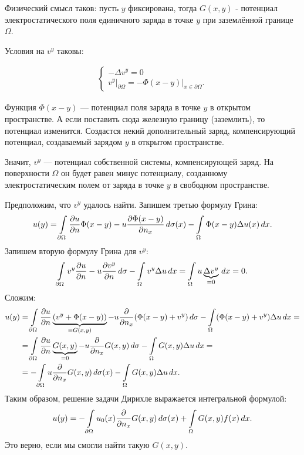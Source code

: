 Физический смысл таков: пусть $y$ фиксирована, тогда $G(x,y)$ - потенциал электростатического поля единичного заряда в точке $y$ при заземлённой границе $\Omega$.

Условия на $v^y$ таковы:

\begin{align*}
	\begin{cases*}
		- \Delta v^y = 0 \\
		v^y\Big\rvert_{\partial \Omega} = - \Phi(x-y)\Big\rvert_{x \in \partial \Omega}.
	\end{cases*}
\end{align*}

Функция $\Phi(x-y)$ --- потенциал поля заряда в точке $y$ в открытом пространстве. А если поставить сюда железную границу (заземлить), то потенциал изменится. Создастся некий дополнительный заряд, компенсирующий потенциал, создаваемый зарядом $y$ в открытом пространстве.

Значит, $v^y$ --- потенциал собственной системы, компенсирующей заряд. На поверхности $\Omega$ он будет равен минус потенциалу, созданному электростатическим полем от заряда в точке $y$ в свободном пространстве.

Предположим, что $v^y$ удалось найти. Запишем третью формулу Грина:
$$ u(y) = \int \limits_{\partial \Omega} \pder[u]{n} \Phi (x-y) - u \pder[\Phi(x-y)]{n_x} \, d\sigma(x) - \int \limits_\Omega \Phi (x -y) \Delta u(x) \, dx.$$
Запишем вторую формулу Грина для $v^y$:
$$ \int \limits_{\partial \Omega} v^y \pder[u]{n} - u \pder[v^y]{n} \, d\sigma - \int \limits_\Omega v^y \Delta u \, dx = \int \limits_{\Omega} u \underbrace{\Delta v^y}_{ = 0} \, dx = 0.$$
Сложим:
\begin{align*}
	u(y) & = \int \limits_{\partial \Omega} \pder[u]{n} \underbrace{(v^y + \Phi (x-y))}_{=G(x,y)} - u \pder{n_x} (\Phi (x-y) + v^y) \, d\sigma - \int \limits_\Omega (\Phi (x-y) + v^y) \Delta u \, dx = \\
	& = \int \limits_{\partial \Omega} \pder[u]{n} \underbrace{G(x,y)}_{=0} - u \pder{n_x} G(x,y) \, d\sigma - \int \limits_\Omega G(x,y) \Delta u \, dx = \\
	& = - \int \limits_{\partial \Omega} u \pder{n_x} G(x,y) \, d\sigma(x) - \int \limits_\Omega G(x,y) \Delta u \, dx.
\end{align*}
Таким образом, решение задачи Дирихле выражается интегральной формулой:
$$ u(y) = - \int \limits_{\partial \Omega} u_0(x) \pder{n_x} G(x,y) \, d\sigma(x) + \int \limits_\Omega G(x,y) f(x) \, dx.$$
Это верно, если мы смогли найти такую $G(x,y)$.

